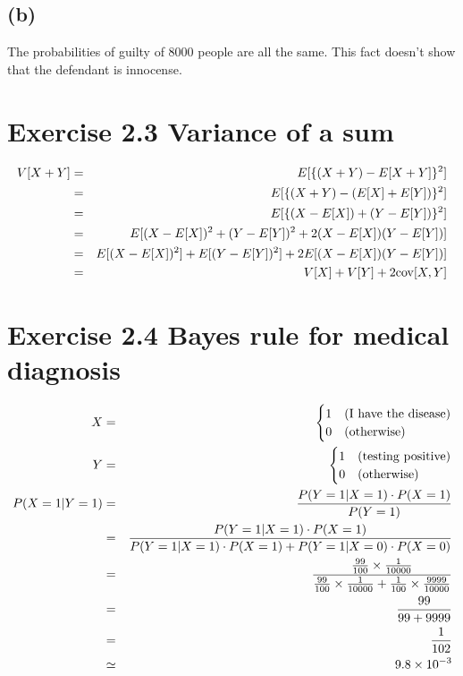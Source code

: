 \documentclass{jsarticle}
\begin{document}
\subsection*{(b)}
The probabilities of guilty of 8000 people are all the same. This fact doesn't show that the defendant is innocense.

\section*{Exercise 2.3 Variance of a sum}
\begin{eqnarray}
V[X+Y] & = & E[\{(X+Y)-E[X+Y]\}^2]\\
& = & E[\{(X+Y)-(E[X]+E[Y])\}^2]\\
& = & E[\{(X-E[X])+(Y-E[Y])\}^2]\\
& = & E[(X-E[X])^2+(Y-E[Y])^2+2(X-E[X])(Y-E[Y])]\\
& = & E[(X-E[X])^2] + E[(Y-E[Y])^2] + 2E[(X-E[X])(Y-E[Y])]\\
& = & V[X] + V[Y] + 2{\rm cov}[X,Y]
\end{eqnarray}

\section*{Exercise 2.4 Bayes rule for medical diagnosis}
\begin{eqnarray}
X & = & \begin{cases}
1 & (\rm I\ have\ the\ disease) \\
0 & (\rm otherwise)
\end{cases}\\
Y & = & \begin{cases}
1 & (\rm testing\ positive)\\
0 & (\rm otherwise)
\end{cases}\\
P(X=1|Y=1) & = & \frac{P(Y=1|X=1)\cdot P(X=1)}{P(Y=1)}\\
& = & \frac{P(Y=1|X=1)\cdot P(X=1)}{P(Y=1|X=1)\cdot P(X=1)+P(Y=1|X=0)\cdot P(X=0)}\\
& = & \frac{\frac{99}{100}\times \frac{1}{10000}}{\frac{99}{100}\times \frac{1}{10000} + \frac{1}{100}\times \frac{9999}{10000}}\\
& = & \frac{99}{99 + 9999}\\
& = & \frac{1}{102}\\
& \simeq & 9.8\times 10^{-3}
\end{eqnarray}
\end{document}
